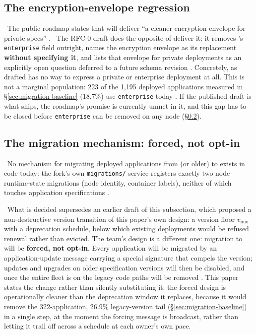 \subsection{The encryption-envelope regression}
\label{sec:envelope-regression}

\planned\ The public roadmap states that  will deliver ``a cleaner encryption envelope for
private specs'' . \inprogress\ The RFC-0 draft does the
opposite of deliver it: it removes 's \texttt{enterprise} field outright, names the
encryption envelope as its replacement \textbf{without specifying it}, and
lists that envelope for private deployments as an explicitly open question deferred to a
future schema revision . Concretely,  as drafted
has no way to express a private or enterprise deployment at all. This is not a marginal population:
223 of the 1{,}195 deployed applications measured in \S\ref{sec:migration-baseline} (18.7\%) use
\texttt{enterprise} today .
If the published draft is what ships, the roadmap's promise is currently unmet in it, and this gap
has to be closed before \texttt{enterprise} can be removed on any node (\S\ref{sec:migration-mechanism}).

\subsection{The migration mechanism: forced, not opt-in}
\label{sec:migration-mechanism}

\inprogress\ No mechanism for migrating deployed applications from  (or older) to 
exists in code today: the fork's own \texttt{migrations/} service registers exactly two node-runtime-state
migrations (node identity, container labels), neither of which touches application specifications
.

\planned\ What is decided supersedes an earlier draft of this subsection, which proposed a
non-destructive version transition of this paper's own design: a version floor $v_{\min}$ with a
deprecation schedule, below which existing deployments would be refused renewal rather than
evicted. The team's design is a different one: migration to  will be
\textbf{forced, not opt-in}. Every application will be migrated by an application-update message
carrying a special signature that compels the  version; updates and upgrades on older
specification versions will then be disabled, and once the entire fleet is on  the legacy
code paths will be removed . This paper states
the change rather than silently substituting it: the forced design is operationally cleaner than the
deprecation window it replaces, because it would remove the 322-application, 26.9\% legacy-version
tail (\S\ref{sec:migration-baseline}) in a single step, at the moment the forcing message is
broadcast, rather than letting it trail off across a schedule at each owner's own pace.


